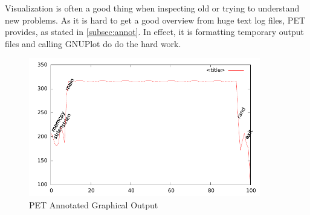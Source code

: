 Visualization is often a good thing when inspecting old or trying to understand
new problems. As it is hard to get a good overview from huge text log files, PET
provides, as stated in \autoref{subsec:annot}. In effect, it is formatting
temporary output files and calling GNUPlot do do the hard work.

\begin{figure}
    \includegraphics[width=0.9\textwidth]{figs/annot.pdf}
    \caption{PET Annotated Graphical Output}
    \label{fig:annot}
\end{figure}

